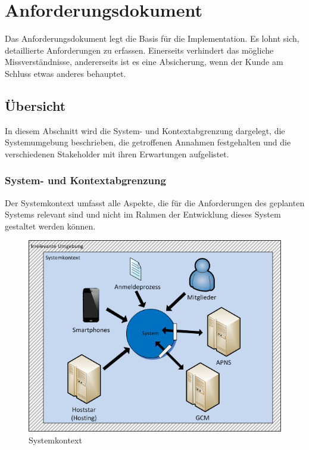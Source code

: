 %
%

\chapter{Anforderungsdokument}\label{chap.anforderungsdokument}

Das Anforderungsdokument legt die Basis für die Implementation. Es lohnt sich, detaillierte Anforderungen zu erfassen. Einerseits verhindert das mögliche Missverständnisse, andererseits ist es eine Absicherung, wenn der Kunde am Schluss etwas anderes behauptet.

\section{Übersicht}\label{anf_uebersicht}

In diesem Abschnitt  wird die System- und Kontextabgrenzung dargelegt, die Systemumgebung beschrieben, die getroffenen Annahmen festgehalten und die verschiedenen Stakeholder mit ihren Erwartungen aufgelistet.

\subsection{System- und Kontextabgrenzung}\label{systemabgrenzung}
Der Systemkontext umfasst alle Aspekte, die für die Anforderungen des geplanten Systems relevant sind und nicht im Rahmen der Entwicklung dieses System gestaltet werden können.\cite{req_eng_book} 
\begin{figure}[h]
\includegraphics{images/visio/systemkontext.png}
\caption{Systemkontext}
\label{fig:systemkontext}
\end{figure}

